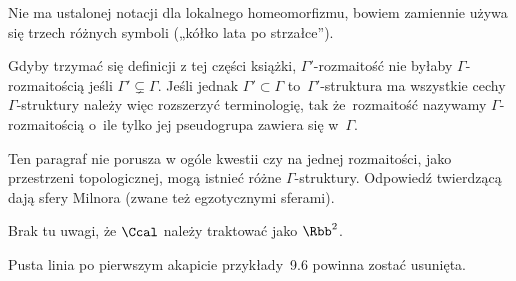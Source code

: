 \documentclass[a4paper,11pt]{article}
\numberwithin{equation}{section}
\begin{document}
\vspace{\spaceFour}





\noindent
{} Nie ma ustalonej notacji dla lokalnego homeomorfizmu, bowiem
zamiennie używa się trzech różnych symboli („kółko lata po strzałce”).

\vspace{\spaceFour}





\noindent
{} Gdyby trzymać się definicji z tej części książki, $\Gamma'$-rozmaitość
nie byłaby $\Gamma$-rozmaitością jeśli $\Gamma' \subsetneq \Gamma$. Jeśli jednak $\Gamma' \subset \Gamma$
to~$\Gamma'$-struktura ma wszystkie cechy $\Gamma$-struktury należy więc rozszerzyć
terminologię, tak że~rozmaitość nazywamy $\Gamma$-rozmaitością o~ile tylko jej
pseudogrupa zawiera się w~$\Gamma$.

\vspace{\spaceFour}





\noindent
{} Ten paragraf nie porusza w ogóle kwestii czy na jednej
rozmaitości, jako przestrzeni topologicznej, mogą istnieć różne
$\Gamma$-struktury. Odpowiedź twierdzącą dają sfery Milnora (zwane też
egzotycznymi sferami).

\vspace{\spaceFour}





\noindent
{} Brak tu uwagi, że $\Ccal$ należy traktować jako $\Rbb^{ 2 }$.

\vspace{\spaceFour}





\noindent
{} Pusta linia po pierwszym akapicie przykłady~9.6 powinna zostać
usunięta.

\vspace{\spaceFour}
\end{document}
